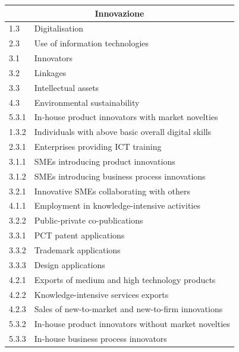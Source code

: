 \documentclass[a4paper,12pt, openright]{report}
\begin{document}
\begin{table}[h!]
    \centering
    \begin{tabular}{ |l|l| }
        \hline
        \multicolumn{2}{|c|}{\textbf{Innovazione}} \\
        \hline
        1.3 & Digitalisation\\
        \hline
        2.3 & Use of information technologies \\
        \hline
        3.1 & Innovators\\
        \hline
        3.2 & Linkages \\
        \hline
        3.3 & Intellectual assets \\
        \hline
        4.3 & Environmental sustainability \\
        \hline
        5.3.1 & In-house product innovators with market novelties \\
        \hline
        1.3.2 & Individuals with above basic overall digital skills \\
        \hline
        2.3.1 & Enterprises providing ICT training \\
        \hline
        3.1.1 & SMEs introducing product innovations  \\
        \hline
        3.1.2 & SMEs introducing business process innovations \\
        \hline
        3.2.1 & Innovative SMEs collaborating with others  \\
        \hline
        4.1.1 & Employment in knowledge-intensive activities \\
        \hline
        3.2.2 & Public-private co-publications  \\
        \hline
        3.3.1 & PCT patent applications  \\
        \hline
        3.3.2 & Trademark applications  \\
        \hline
        3.3.3 & Design applications \\
        \hline
        4.2.1 & Exports of medium and high technology products\\
        \hline
        4.2.2 & Knowledge-intensive services exports\\
        \hline
        4.2.3 & Sales of new-to-market and new-to-firm innovations \\
        \hline
        5.3.2 & In-house product innovators without market novelties \\
        \hline
        5.3.3 & In-house business process innovators \\

\end{tabular}
\end{table}
\end{document}
